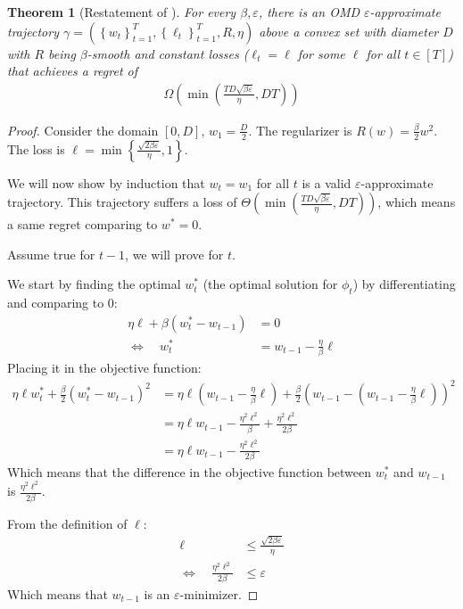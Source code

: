 \documentclass[10pt]{article}
\newtheorem*{theorem*}{Theorem}
\theoremstyle{definition}
\theoremstyle{remark}
\renewcommand{\epsilon}{\varepsilon}
\newcommand{\curly}[1]{ {\left\{ #1 \right\}}}
\newcommand{\roundy}[1]{ {\left( #1 \right)}}
\begin{document}
\begin{theorem*}[Restatement of ]\label{thm:smooth lower bound}
For every $\beta,\epsilon$, there is an OMD $\epsilon$-approximate trajectory $\gamma = (\curly{w_t}_{t=1}^T, \curly{\ell_t}_{t=1}^T, R, \eta)$ above a convex set with diameter $D$ with $R$ being $\beta$-smooth and constant losses ($\ell_t=\ell$ for some $\ell$ for all $t\in[T]$) that achieves a regret of 
\begin{align*}
    \Omega\roundy{\min\roundy{\frac{TD\sqrt{\beta\epsilon}}{\eta}, DT}}
\end{align*}
\end{theorem*}
\begin{proof}
Consider the domain $[0,D]$, $w_1 = \frac D2$. The regularizer is $R(w) = \frac{\beta}{2}w^2$. The loss is $\ell = \min\curly{\frac{\sqrt{2\beta\epsilon}}{\eta},1}$.

We will now show by induction that $w_t = w_1$ for all $t$ is a valid $\epsilon$-approximate trajectory. This trajectory suffers a loss of $\Theta\roundy{\min\roundy{\frac{TD\sqrt{\beta\epsilon}}{\eta}, DT}}$, which means a same regret comparing to $w^* = 0$.

Assume true for $t-1$, we will prove for $t$. 

We start by finding the optimal $w_t^*$ (the optimal solution for $\phi_t$) by differentiating and comparing to $0$:
\begin{align*}
    \eta\ell + \beta(w_t^* - w_{t-1}) &= 0 \\
    \Longleftrightarrow\quad w_t^* &= w_{t-1} - \frac{\eta}{\beta}\ell
\end{align*}
Placing it in the objective function:
\begin{align*}
    \eta\ell w_t^* + \frac{\beta}{2}\roundy{w_t^* - w_{t-1}}^2 &= \eta\ell\roundy{w_{t-1} - \frac{\eta}{\beta}\ell} + \frac{\beta}{2}\roundy{w_{t-1} - \roundy{w_{t-1} - \frac{\eta}{\beta}\ell}}^2 \\
    &= \eta\ell w_{t-1} - \frac{\eta^2\ell^2}{\beta} + \frac{\eta^2\ell^2}{2\beta} \\
    &= \eta\ell w_{t-1} - \frac{\eta^2\ell^2}{2\beta}
\end{align*}
Which means that the difference in the objective function between $w_t^*$ and $w_{t-1}$ is $\frac{\eta^2\ell^2}{2\beta}$.

From the definition of $\ell$:
\begin{align*}
    \ell &\le \frac{\sqrt{2\beta\epsilon}}{\eta} \\
    \Longleftrightarrow\quad\frac{\eta^2\ell^2}{2\beta} &\le \epsilon
\end{align*}
Which means that $w_{t-1}$ is an $\epsilon$-minimizer.
\end{proof}  
\end{document}
